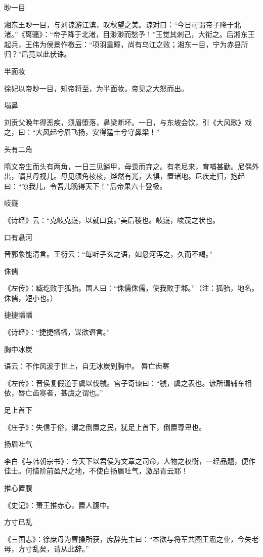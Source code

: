 \documentclass[a4paper,12pt,UTF8,twoside]{ctexbook}
\begin{document}
    眇一目
    
    湘东王眇一目，与刘谅游江滨，叹秋望之美。谅对曰：“今日可谓帝子降于北渚。”《离骚》：“帝子降于北渚，目渺渺而愁予！”王觉其刺己，大衔之。后湘东王起兵，王伟为侯景作檄云：“项羽重瞳，尚有乌江之败；湘东一目，宁为赤县所归？”后竟以此伏诛。
    
    半面妆
    
    徐妃以帝眇一目，知帝将至，为半面妆。帝见之大怒而出。
    
    塌鼻
    
    刘贡父晚年得恶疾，须眉堕落，鼻梁断坏。一日，与东坡会饮，引《大风歌》戏之，曰：“大风起兮眉飞扬，安得猛士兮守鼻梁！”
    
    头有二角
    
    隋文帝生而头有两角，一日三见鳞甲，母畏而弃之。有老尼来，育哺甚勤。尼偶外出，嘱其母视儿。母见须角棱棱，烨然有光，大惧，置诸地。尼疾走归，抱起曰：“惊我儿，令吾儿晚得天下！”后帝果六十登极。
    
    岐嶷
    
    《诗经》云：“克岐克嶷，以就口食。”美后稷也。岐嶷，峻茂之状也。
    
    口有悬河
    
    晋郭象能清言。王衍云：“每听子玄之语，如悬河泻之，久而不竭。”
    
    侏儒
    
    《左传》：臧纥败于狐骀。国人曰：“侏儒侏儒，使我败于邾。”（注：狐骀，地名。侏儒，短小也。）
    
    捷捷幡幡
    
    《诗经》：“捷捷幡幡，谋欲谮言。”
    
    胸中冰炭
    
    语云：不作风波于世上，自无冰炭到胸中。
    唇亡齿寒
    
    《左传》：晋侯复假道于虞以伐虢。宫子奇谏曰：“虢，虞之表也。谚所谓辅车相依，唇亡齿寒者，甚虞之谓也。”
    
    足上首下
    
    《庄子》：失信于俗，谓之倒置之民，犹足上首下，倒置尊卑也。
    
    扬眉吐气
    
    李白《与韩朝宗书》：今天下以君侯为文章之司命，人物之权衡，一经品题，便作佳士。何惜阶前盈尺之地，不使白扬眉吐气，激昂青云耶！
    
    推心置腹
    
    《史记》：萧王推赤心，置人腹中。
    
    方寸已乱
    
    《三国志》：徐庶母为曹操所获，庶辞先主曰：“本欲与将军共图王霸之业，今失老母，方寸乱矣，请从此辞。”
    
\end{document}
